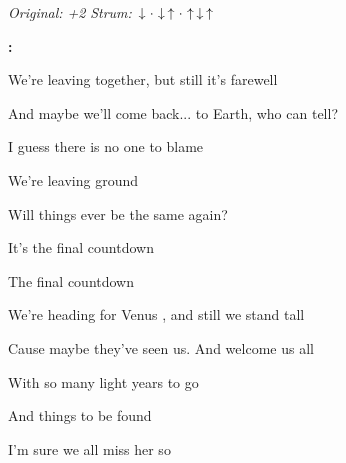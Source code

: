\begin{song}


\begin{headerbox}
\textit{Original: +2} \quad
\textit{Strum:} $\Down\Miss\Down\Up\Miss\Up\Down\Up$
\end{headerbox}

\begin{hchordbox}
\end{hchordbox}

\Large

\bigskip

\Intro\textbf{:} \par
{}    \par
{}    \par
{}     \par

\bigskip

 We’re leaving together, but still it’s farewell \par
{} And maybe we’ll come back...  to Earth, who can tell? \par
{} I guess there is no one to blame \par
{} We’re leaving ground  \par
{} Will things ever be the same again? \par

\bigskip

It’s the final countdown    \par
The final countdown    \par

\bigskip

 We’re heading for Venus , and still we stand tall \par
{} Cause maybe they’ve seen us.  And welcome us all  \par
{} With so many light years to go \par
{} And things to be found  \par
{} I’m sure we all miss her so \par


\end{song}
